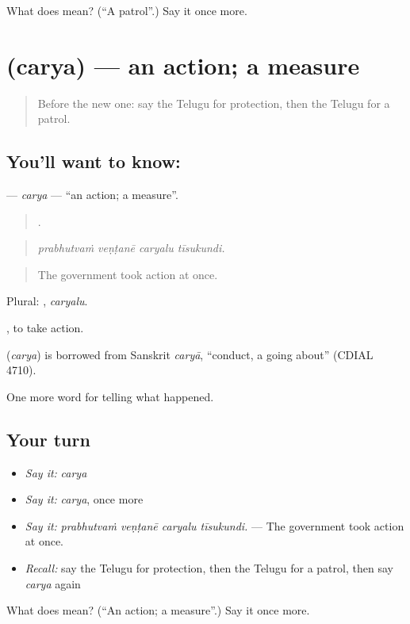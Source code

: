 \begin{tcolorbox}[breakable,colback=teal!4,colframe=teal!35!black,title={Before you move on}]
What does  mean? (\textquotedblleft{}A patrol\textquotedblright{}.) Say it once more.
\end{tcolorbox}
\section[\texorpdfstring{\te{చర్య} (carya)}{చర్య (carya)}]{ (carya) — an action; a measure}

\label{lesson:TE-C377-carya}



\begin{quote}
Before the new one: say the Telugu for protection, then the Telugu for a patrol.
\end{quote}

\subsection*{You'll want to know: }
\textbf{} — \emph{carya} — \textquotedblleft{}an action; a measure\textquotedblright{}.

\begin{quote}
   .
\end{quote}

\begin{quote}
\emph{prabhutvaṁ veṇṭanē caryalu tīsukundi.}
\end{quote}

\begin{quote}
The government took action at once.
\end{quote}

Plural: , \emph{caryalu}.

 , to take action.

\begin{cousinweb}
\textbf{} (\emph{carya}) is borrowed from Sanskrit \emph{caryā}, \textquotedblleft{}conduct, a going about\textquotedblright{} (CDIAL 4710).
\end{cousinweb}

\begin{grammarlens}[title={What you've built}]
One more word for telling what happened.
\end{grammarlens}

\subsection*{Your turn}
\begin{itemize}
\raggedright
  \item \emph{Say it:} \emph{carya}
  \item \emph{Say it:} \emph{carya}, once more
  \item \emph{Say it:} \emph{prabhutvaṁ veṇṭanē caryalu tīsukundi.} — The government took action at once.
  \item \emph{Recall:} say the Telugu for protection, then the Telugu for a patrol, then say \emph{carya} again
\end{itemize}

\begin{tcolorbox}[breakable,colback=teal!4,colframe=teal!35!black,title={Before you move on}]
What does  mean? (\textquotedblleft{}An action; a measure\textquotedblright{}.) Say it once more.
\end{tcolorbox}
